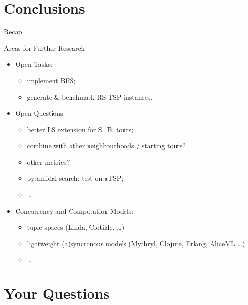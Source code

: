 \documentclass[
  size=8pt,
  style=klope,
  paper=screen,
  pauseslide,
  nopagebreaks,
  hlsections,
  fleqn
]{powerdot}
\begin{document}
\section[template=wideslide]{Conclusions}

\begin{slide}[toc=Recap]{Recap}
\tableofcontents[content=all,type=0]
\end{slide}

\begin{slide}{Areas for Further Research}
{\small

  \begin{itemize}
  \item
  Open Tasks:
    \begin{itemize}
    \item implement BFS;
    \item generate \& benchmark RS-TSP instances.
    \end{itemize}
  \item
  Open Questions:
    \begin{itemize}
    \item better LS extension for S.\ B. tours;
    \item combine with other neighbourhoods / starting tours?
    \item other metrics?
    \item pyramidal search: test on aTSP;
    \item \ldots
    \end{itemize}
  \item
  Concurrency and Computation Models:
    \begin{itemize}
    \item tuple spaces (Linda, Clotilde, \ldots)
    \item lightweight (a)syncronous models (Mythryl, Clojure, Erlang, AliceML \ldots)
    \item \ldots
    \end{itemize}
  \end{itemize}

}
\end{slide}


\section[template=wideslide]{Your Questions}
\end{document}
